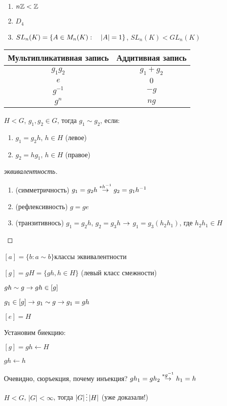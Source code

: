 \documentclass[main2]{subfiles}
\begin{document}
\begin{examples}
    \begin{enumerate}
    	\item $n\mathbb{Z} < \mathbb{Z}$
    	\item $D_4$
    	\item $SL_n(K)=\{A \in M_n(K): \quad |A|=1\}$, $SL_n(K)<GL_n(K)$
	\end{enumerate}
\end{examples}

\begin{tabular} {c|c}
	Мультипликативная запись & Аддитивная запись\\ \hline
	$g_1 g_2$ & $g_1 + g_2$\\
	$e$ & $0$\\
	$g^{-1}$ & $-g$\\
    $g^n$ & $ng$
\end{tabular}

\begin{definition}
    $H<G$, $g_1,g_2 \in G$, тогда $g_1 \sim g_2$, если:
    \begin{enumerate}
    	\item $g_1=g_2 h$, $h \in H$ (левое)
    	\item $g_2=h g_1$, $h \in H$ (правое)
	\end{enumerate}
\end{definition}

\begin{proof}[эквивалентность]
    \begin{enumerate}
    	\item (симметричность) $g_1=g_2 h \overset{*h^{-1}}{\rightarrow} g_2 = g_1 h^{-1}$
    	\item (рефлексивность) $g=ge$
    	\item (транзитивнось) $g_1=g_2 h$, $g_2 = g_3 h$ $\rightarrow$ $g_1=g_3(h_2 h_1)$, где $h_2 h_1 \in H$
	\end{enumerate}
\end{proof}

\begin{definition}
    $[a] = \{b:a∼b\}$классы эквивалентности
\end{definition}

\begin{definition}
    $[g] = g H = \{g h, h \in H \}$ (левый класс смежности)

    $g h \sim g \rightarrow g h \in [g]$

    $g_1 \in [g] \rightarrow g_1 \sim g \rightarrow g_1 = g h$
\end{definition}

\begin{utv}
    $[e]=H$

    Установим биекцию:

    $[g]=gh \leftarrow H$

    $gh \leftarrow h$

    Очевидно, сюръекция, почему инъекция? $g h_1 = g h_2 \overset{*g^{-1}}{\rightarrow} h_1 = h$
\end{utv}

\begin{theorem}[Лагранжа]
$H < G$, $|G| < \infty$, тогда $|G| \devides |H|$ (уже доказали!)
\end{theorem}
\end{document}
